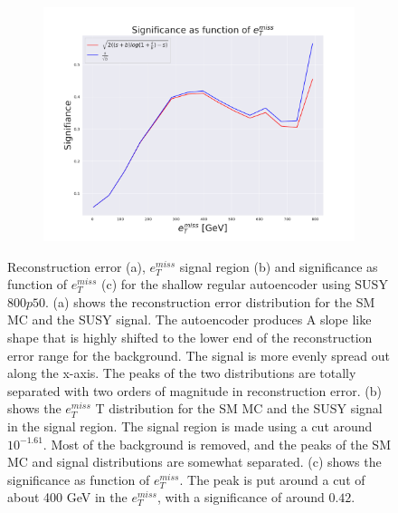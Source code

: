 \begin{figure}[H]
    \hfill  
    \begin{subfigure}{.49\textwidth}
        \includegraphics[width=\textwidth]{Figures/AE_testing/small/2lep/significance_etmiss_800p0p050_-1.6117055611472277.pdf}
        \caption{}
        \label{fig:AE_2lep_small_signi_800}
    \end{subfigure}
    \hfill      
    \caption[2lep shallow network | $800p50$ | AE]{Reconstruction error (a), $e_T^{miss}$ signal region (b) and significance as function of 
    $e_T^{miss}$ (c) for the shallow regular autoencoder using SUSY $800p50$. 
    (a) shows the reconstruction error distribution for the SM MC and the SUSY signal. 
    The autoencoder produces A slope like shape that is highly shifted to the lower end of the reconstruction error range
for the background. The signal is more evenly spread out along the x-axis. The peaks of the two distributions are totally separated
with two orders of magnitude in reconstruction error. (b) shows the $e_T^{miss}$
T distribution for the SM MC and the SUSY signal in the signal region. The signal region is made using a cut around
$10^{-1.61}$. Most of the background is removed, and the peaks of the SM MC and signal distributions are
somewhat separated. (c) shows the significance as function of $e_T^{miss}$. The peak is put 
around a cut of about 400 GeV in the $e_T^{miss}$, with a significance of around $0.42$.}
    \label{fig:AE_2lep_small_rec_sig_signi_800}
\end{figure}



